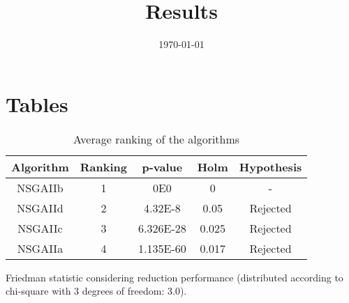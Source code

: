 \documentclass{article}
\title{Results}
\author{}
\date{\today}
\begin{document}
\oddsidemargin 0in \topmargin 0in\maketitle

\section{Tables}
\begin{table}[!htp]
\centering
\begin{tabular}{c|c|c|c|c}
Algorithm&Ranking&p-value&Holm&Hypothesis\\
\hline
NSGAIIb & 1 & 0E0 & 0 & -\\
NSGAIId & 2 & 4.32E-8 & 0.05 & Rejected\\
NSGAIIc & 3 & 6.326E-28 & 0.025 & Rejected\\
NSGAIIa & 4 & 1.135E-60 & 0.017 & Rejected\\
\end{tabular}
\caption{Average ranking of the algorithms}
\end{table}


Friedman statistic considering reduction performance (distributed according to chi-square with 3 degrees of freedom: 3.0).
\end{document}
